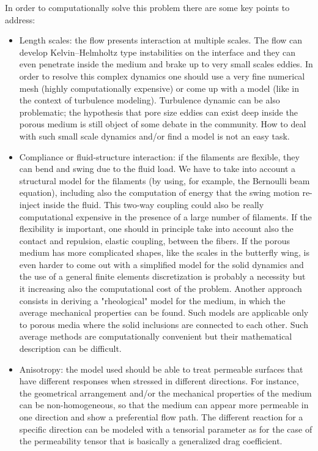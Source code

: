 In order to computationally solve this problem there are some key points to address:
\begin{itemize}
	\item Length scales: the flow presents interaction at multiple scales. The flow can develop Kelvin–Helmholtz type instabilities on the interface and they can even penetrate inside the medium and brake up to very small scales eddies. In order to resolve this complex dynamics one should use a very fine numerical mesh (highly computationally expensive) or come up with a model (like in the context of turbulence modeling).
	Turbulence dynamic can be also problematic; the hypothesis that pore size eddies can exist deep inside the porous medium is still object of some debate in the community.
	How to deal with such small scale dynamics and/or find a model is not an easy task. 
	
	\item Compliance or fluid-structure interaction: if the filaments are flexible, they can bend and swing due to the fluid load.
	We have to take into account a structural model for the filaments (by using, for example, the Bernoulli beam equation), including also the computation of energy that the swing motion re-inject inside the fluid.
	This two-way coupling could also be really computational expensive in the presence of a large number of filaments. If the flexibility is important, one should in principle take into account also the contact and repulsion, elastic coupling, between the fibers.
	If the porous medium has more complicated shapes, like the scales in the butterfly wing, is even harder to come out with a simplified model for the solid dynamics and the use of a general finite elements discretization is probably a necessity but it increasing also the computational cost of the problem.
	Another approach consists in deriving a "rheological" model for the medium, in which the average mechanical properties can be found.
	Such models are applicable only to porous media where the solid inclusions are connected to each other. Such average methods are computationally convenient but their mathematical description can be difficult.
	
	\item Anisotropy: the model used should be able to treat permeable surfaces that have different responses when stressed in different directions. For instance, the geometrical arrangement and/or the mechanical properties of the medium can be non-homogeneous, so that the medium can appear more permeable in one direction and show a preferential flow path. The different reaction for a specific direction can be modeled with a tensorial parameter as for the case of the permeability tensor that is basically a generalized drag coefficient.
\end{itemize}

